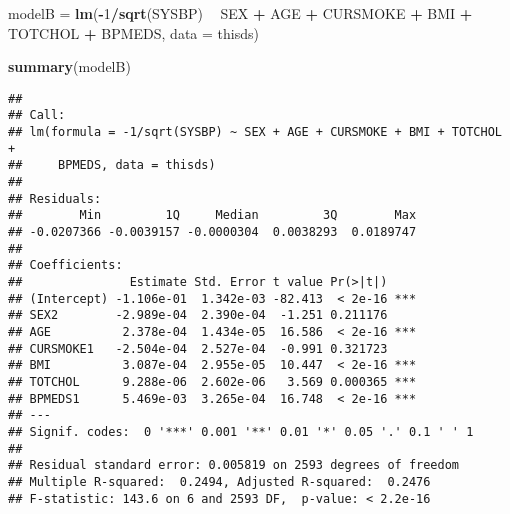 \documentclass[10pt,ignorenonframetext,]{beamer}
\newenvironment{Shaded}{\begin{snugshade}}{\end{snugshade}}
\newcommand{\DataTypeTok}[1]{\textcolor[rgb]{0.13,0.29,0.53}{#1}}
\newcommand{\DecValTok}[1]{\textcolor[rgb]{0.00,0.00,0.81}{#1}}
\newcommand{\KeywordTok}[1]{\textcolor[rgb]{0.13,0.29,0.53}{\textbf{#1}}}
\newcommand{\NormalTok}[1]{#1}
\newcommand{\OperatorTok}[1]{\textcolor[rgb]{0.81,0.36,0.00}{\textbf{#1}}}
\newcommand{\StringTok}[1]{\textcolor[rgb]{0.31,0.60,0.02}{#1}}
\begin{document}
\begin{frame}[fragile]

\scriptsize

\begin{Shaded}
\begin{Highlighting}[]
\NormalTok{modelB =}\StringTok{ }\KeywordTok{lm}\NormalTok{(}\OperatorTok{-}\DecValTok{1}\OperatorTok{/}\KeywordTok{sqrt}\NormalTok{(SYSBP) }\OperatorTok{~}\StringTok{ }\NormalTok{SEX }\OperatorTok{+}\StringTok{ }\NormalTok{AGE }\OperatorTok{+}\StringTok{ }\NormalTok{CURSMOKE }\OperatorTok{+}\StringTok{ }\NormalTok{BMI }\OperatorTok{+}\StringTok{ }\NormalTok{TOTCHOL }\OperatorTok{+}\StringTok{ }\NormalTok{BPMEDS, }
    \DataTypeTok{data =}\NormalTok{ thisds)}

\KeywordTok{summary}\NormalTok{(modelB)}
\end{Highlighting}
\end{Shaded}

\begin{verbatim}
## 
## Call:
## lm(formula = -1/sqrt(SYSBP) ~ SEX + AGE + CURSMOKE + BMI + TOTCHOL + 
##     BPMEDS, data = thisds)
## 
## Residuals:
##        Min         1Q     Median         3Q        Max 
## -0.0207366 -0.0039157 -0.0000304  0.0038293  0.0189747 
## 
## Coefficients:
##               Estimate Std. Error t value Pr(>|t|)    
## (Intercept) -1.106e-01  1.342e-03 -82.413  < 2e-16 ***
## SEX2        -2.989e-04  2.390e-04  -1.251 0.211176    
## AGE          2.378e-04  1.434e-05  16.586  < 2e-16 ***
## CURSMOKE1   -2.504e-04  2.527e-04  -0.991 0.321723    
## BMI          3.087e-04  2.955e-05  10.447  < 2e-16 ***
## TOTCHOL      9.288e-06  2.602e-06   3.569 0.000365 ***
## BPMEDS1      5.469e-03  3.265e-04  16.748  < 2e-16 ***
## ---
## Signif. codes:  0 '***' 0.001 '**' 0.01 '*' 0.05 '.' 0.1 ' ' 1
## 
## Residual standard error: 0.005819 on 2593 degrees of freedom
## Multiple R-squared:  0.2494, Adjusted R-squared:  0.2476 
## F-statistic: 143.6 on 6 and 2593 DF,  p-value: < 2.2e-16
\end{verbatim}

\normalsize

\end{frame}
\end{document}
